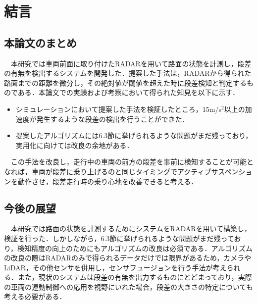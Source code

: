 \chapter{結言}

\section{本論文のまとめ}
　本研究では車両前面に取り付けたRADARを用いて路面の状態を計測し，段差の有無を検出するシステムを開発した．提案した手法は，RADARから得られた路面までの距離を微分し，その絶対値が閾値を超えた時に段差検知と判定するものである．本論文での実験および考察において得られた知見を以下に示す．
\begin{itemize}
    \item シミュレーションにおいて提案した手法を検証したところ，15m/s$^2$以上の加速度が発生するような段差の検出を行うことができた．
    \item 提案したアルゴリズムには6.3節に挙げられるような問題がまだ残っており，実用化に向けては改良の余地がある．
\end{itemize}

　この手法を改良し，走行中の車両の前方の段差を事前に検知することが可能となれば，車両が段差に乗り上げるのと同じタイミングでアクティブサスペンションを動作させ，段差走行時の乗り心地を改善できると考える．

\section{今後の展望}
　本研究では路面の状態を計測するためにシステムをRADARを用いて構築し，検証を行った．しかしながら，6.3節に挙げられるような問題がまだ残っており，検知精度の向上のためにもアルゴリズムの改良は必須である．アルゴリズムの改良の際はRADARのみで得られるデータだけでは限界があるため，カメラやLiDAR，その他センサを併用し，センサフュージョンを行う手法が考えられる．また，現状のシステムは段差の有無を出力するものにとどまっており，実際の車両の運動制御への応用を視野にいれた場合，段差の大きさの特定についても考える必要がある．
